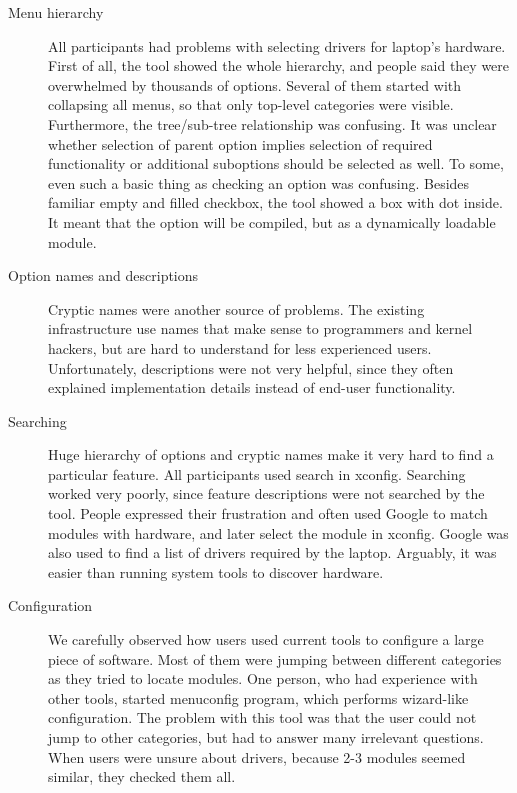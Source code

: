 \documentclass{chi2009}
\begin{document}
\begin{description}
  \item[Menu hierarchy]
All participants had problems with selecting drivers for laptop's hardware. First of all, the tool showed the whole hierarchy, and people said they were overwhelmed by thousands of options. Several of them started with collapsing all menus, so that only top-level categories were visible. Furthermore, the tree/sub-tree relationship was confusing. It was unclear whether selection of parent option implies selection of required functionality or additional suboptions should be selected as well. To some, even such a basic thing as checking an option was confusing. Besides familiar empty and filled checkbox, the tool showed a box with dot inside. It meant that the option will be compiled, but as a dynamically loadable module.

  \item[Option names and descriptions]
Cryptic names were another source of problems. The existing infrastructure use names that make sense to programmers and kernel hackers, but are hard to understand for less experienced users. Unfortunately, descriptions were not very helpful, since they often explained implementation details instead of end-user functionality.

  \item[Searching]
Huge hierarchy of options and cryptic names make it very hard to find a particular feature. All participants used search in \textsf{xconfig}. Searching worked very poorly, since feature descriptions were not searched by the tool. People expressed their frustration and often used Google to match modules with hardware, and later select the module in \textsf{xconfig}. Google was also used to find a list of drivers required by the laptop. Arguably, it was easier than running system tools to discover hardware.

  \item[Configuration]
We carefully observed how users used current tools to configure a large piece of software. Most of them were jumping between different categories as they tried to locate modules. One person, who had experience with other tools, started \textsf{menuconfig} program, which performs wizard-like configuration. The problem with this tool was that the user could not jump to other categories, but had to answer many irrelevant questions. When users were unsure about drivers, because 2-3 modules seemed similar, they checked them all. 
\end{description}
\end{document}
